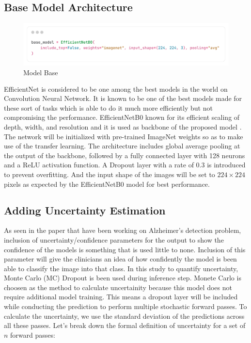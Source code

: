 \documentclass[12pt,onecolumn]{report}
\begin{document}
\subsection{Base Model Architecture}
\begin{figure}[h!]
    \centering
    \includegraphics[width=0.8\columnwidth]{figures/res_model_base.png}  %
    \caption{Model Base} %
    \label{fig:base model} %
\end{figure}
EfficientNet is considered to be one among the best models in the world on Convolution Neural Network. It is known to be one of the best models made for these sort of tasks which is able to do it much more efficiently but not compromising the performance. EfficientNetB0 known for its efficient scaling of depth, width, and resolution and it is used as backbone of the proposed model \cite{2021Hoang}. The network will be initialized with pre-trained ImageNet weights so as to make use of the transfer learning. The architecture includes global average pooling at the output of the backbone, followed by a fully connected layer with 128 neurons and a ReLU activation function. A Dropout layer with a rate of 0.3 is introduced to prevent overfitting. And the input shape of the images will be set to $224 \times 224$ pixels as expected by the EfficientNetB0 model for best performance.

\subsection{Adding Uncertainty Estimation}
As seen in the paper that have been working on Alzheimer’s detection problem, inclusion of uncertainty/confidence parameters for the output to show the confidence of the models is something that is used little to none. Inclusion of this parameter will give the clinicians an idea of how confidently the model is been able to classify the image into that class. In this study to quantify uncertainty, Monte Carlo (MC) Dropout is been used during inference step. Monete Carlo is choosen as the method to calculate uncertainity because this model does not require additional model training. This means a dropout layer will be included while conducting the prediction to perform multiple stochastic forward passes. To calculate the uncertainty, we use the standard deviation of the predictions across all these passes. Let’s break down the formal definition of uncertainty for a set of $n$ forward passes:
\end{document}
